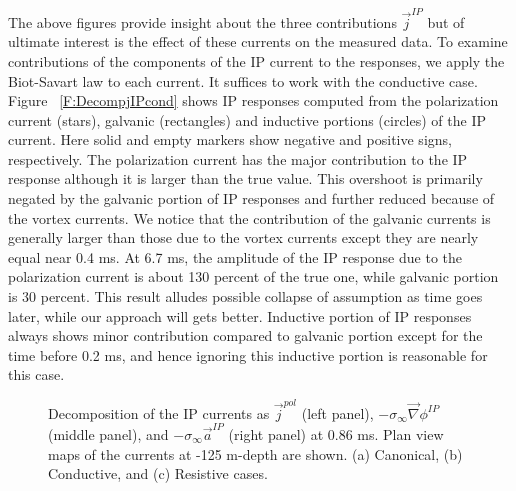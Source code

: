 \documentclass[extra,mreferee]{gji}
\newcommand{\grad}{\vec \nabla}
\newcommand{\siginf}{\sigma_\infty}
\renewcommand {\j}  { {\vec j} }
\begin{document}
The above figures provide insight about the three contributions $\j^{IP}$ but of ultimate interest is the effect of these currents on the measured data. 
To examine contributions of the components of the IP current to the responses, we apply the Biot-Savart law to each current. It suffices to work with the conductive case. 
Figure ~\ref{F:DecompjIPcond} shows IP responses computed from the polarization current (stars), galvanic (rectangles) and inductive portions (circles) of the IP current. Here solid and empty markers show negative and positive signs, respectively. 
The polarization current has the major contribution to the IP response although it is larger than the true value. This overshoot is primarily negated by the galvanic portion of IP responses and further reduced because of the vortex currents. We notice that the contribution of the galvanic currents is generally larger than those due to the vortex currents except they are nearly equal near 0.4 ms. 
At 6.7 ms, the amplitude of the  IP response due to the polarization current is about 130 percent of the true one, while galvanic portion is 30 percent. 
This result alludes possible collapse of \cite{Smith1988a} assumption as time goes later, while our approach will gets better. 
Inductive portion of IP responses always shows minor contribution compared to galvanic portion except for the time before 0.2 ms, and hence ignoring this inductive portion is reasonable for this case. 

\begin{figure}
  \caption{Decomposition of the IP currents as $\j^{pol}$ (left panel), $-\siginf\grad \phi^{IP}$ (middle panel), and $-\siginf\vec{a}^{IP}$ (right panel) at 0.86 ms. Plan view maps of the currents at -125 m-depth are shown. (a) Canonical, (b) Conductive, and (c) Resistive cases. }
  \label{F:IPcurrents_helmholtz_early}
\end{figure}
\end{document}
